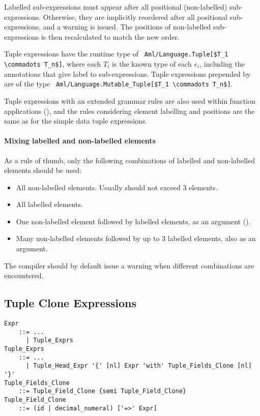 Labelled sub-expressions must appear after all positional (non-labelled) sub-expressions. Otherwise, they are implicitly reordered after all positional sub-expressions, and a warning is issued. The positions of non-labelled sub-expressions is then recalculated to match the new order.

Tuple expressions have the runtime type of ~\lstinline!Aml/Language.Tuple[$T_1 \commadots T_n$]!, where each $T_i$ is the known type of each $e_i$, including the annotations that give label to sub-expressions. Tuple expressions prepended by  are of the type ~\lstinline!Aml/Language.Mutable_Tuple[$T_1 \commadots T_n$]!.

Tuple expressions with an extended grammar rules are also used within function applications (), and the rules considering element labelling and positions are the same as for the simple data tuple expressions. 

\paragraph{Mixing labelled and non-labelled elements}
As a rule of thumb, only the following combinations of labelled and non-labelled elements should be used:
\begin{itemize}
  \item All non-labelled elements. Usually should not exceed 3 elements.
  \item All labelled elements.  
  \item One non-labelled element followed by labelled elements, as an argument (). 
  \item Many non-labelled elements followed by up to 3 labelled elements, also as an argument. 
\end{itemize}
The compiler should by default issue a warning when different combinations are encountered. 





\subsection{Tuple Clone Expressions}
\label{sec:tuple-clone}

\grammar\begin{lstlisting}
Expr
    ::= ...
      | Tuple_Exprs
Tuple_Exprs 
    ::= ...
      | Tuple_Head_Expr '{' [nl] Expr 'with' Tuple_Fields_Clone [nl] '}'
Tuple_Fields_Clone 
    ::= Tuple_Field_Clone {semi Tuple_Field_Clone}
Tuple_Field_Clone
    ::= (id | decimal_numeral) ['=>' Expr]
\end{lstlisting}

